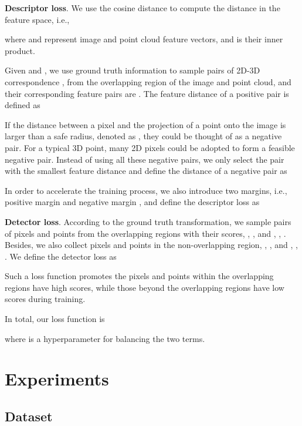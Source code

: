 \documentclass[lettersize,journal]{IEEEtran}
\begin{document}
\noindent\textbf{Descriptor loss}. 
We use the cosine distance to compute the distance in the feature space, i.e., 

where  and  represent image and point cloud feature vectors, and  is their inner product.

Given   and   , we use ground truth information to sample  pairs of 2D-3D correspondence ,  from the overlapping region of the image and point cloud, and their corresponding feature pairs are .
The feature distance of a positive pair is defined as


If the distance between a pixel and the projection of a point onto the image is larger than a safe radius, denoted as , they could be thought of as a negative pair. For a typical 3D point, many 2D pixels could be adopted to form a feasible negative pair.
Instead of using all these negative pairs, we only select the pair with the smallest feature distance and define the distance of a negative pair  as


In order to accelerate the training process, we also introduce two margins, i.e., positive margin  and negative margin , and define the descriptor loss as 


\noindent\textbf{Detector loss}. 
According to the ground truth transformation, we sample  pairs of pixels and points from the overlapping regions with their scores, , ,  and , , . Besides, we also collect  pixels and points in the non-overlapping region, , ,  and , , . We define the detector loss as
 
Such a loss function promotes the pixels and points within the overlapping regions have high scores, while those beyond the overlapping regions have low scores during training.

In total, our loss function is
 
where  is a hyperparameter for balancing the two terms.

\section{Experiments}
\label{sec:exp}

\subsection{Dataset}
\end{document}

